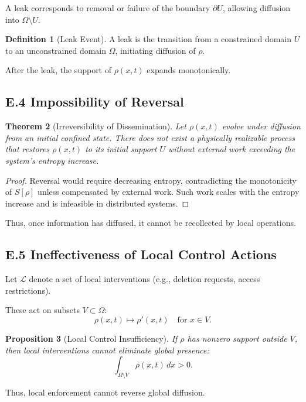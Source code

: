 \documentclass[12pt, oneside]{article}
\theoremstyle{plain}
\newtheorem{theorem}{Theorem}[section]
\newtheorem{proposition}[theorem]{Proposition}
\theoremstyle{definition}
\newtheorem{definition}[theorem]{Definition}
\theoremstyle{remark}
\begin{document}
A leak corresponds to removal or failure of the boundary $\partial U$, allowing diffusion into $\Omega \setminus U$.

\begin{definition}[Leak Event]
A leak is the transition from a constrained domain $U$ to an unconstrained domain $\Omega$, initiating diffusion of $\rho$.
\end{definition}

After the leak, the support of $\rho(x,t)$ expands monotonically.

\subsection{E.4 Impossibility of Reversal}

\begin{theorem}[Irreversibility of Dissemination]
Let $\rho(x,t)$ evolve under diffusion from an initial confined state. There does not exist a physically realizable process that restores $\rho(x,t)$ to its initial support $U$ without external work exceeding the system's entropy increase.
\end{theorem}

\begin{proof}
Reversal would require decreasing entropy, contradicting the monotonicity of $S[\rho]$ unless compensated by external work. Such work scales with the entropy increase and is infeasible in distributed systems.
\end{proof}

Thus, once information has diffused, it cannot be recollected by local operations.

\subsection{E.5 Ineffectiveness of Local Control Actions}

Let $\mathcal{L}$ denote a set of local interventions (e.g., deletion requests, access restrictions).

These act on subsets $V \subset \Omega$:
\[
\rho(x,t) \mapsto \rho'(x,t) \quad \text{for } x \in V.
\]

\begin{proposition}[Local Control Insufficiency]
If $\rho$ has nonzero support outside $V$, then local interventions cannot eliminate global presence:
\[
\int_{\Omega \setminus V} \rho(x,t)\, dx > 0.
\]
\end{proposition}

Thus, local enforcement cannot reverse global diffusion.
\end{document}
